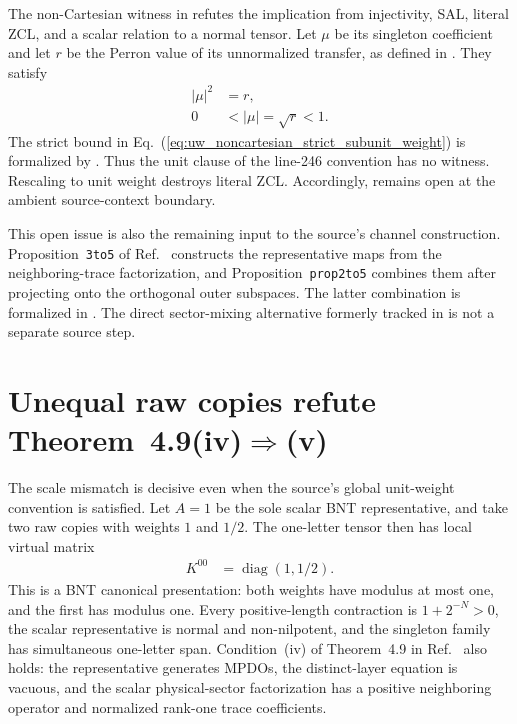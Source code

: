 \documentclass{article}
\begin{document}
The non-Cartesian witness in
 refutes the
implication from injectivity, SAL, literal ZCL, and a scalar relation to a
normal tensor. Let $\mu$ be its singleton coefficient and let $r$ be the
Perron value of its unnormalized transfer, as defined in
. They satisfy
\begin{align}
    |\mu|^2
    &=r,
    \label{eq:uw_noncartesian_weight_perron_relation}\\
    0
    &<|\mu|
    =\sqrt r
    <1.
    \label{eq:uw_noncartesian_strict_subunit_weight}
\end{align}
The strict bound in Eq.~(\ref{eq:uw_noncartesian_strict_subunit_weight}) is
formalized by
. Thus the unit clause of the line-246
convention has no witness. Rescaling to unit weight destroys literal ZCL.
Accordingly,  remains open at the ambient source-context
boundary.

This open issue is also the remaining input to the source's channel
construction. Proposition~\texttt{3to5} of
Ref.~\cite{Cirac2016MPDO_arXiv} constructs the representative maps from the
neighboring-trace factorization, and Proposition~\texttt{prop2to5} combines
them after projecting onto the orthogonal outer subspaces. The latter
combination is formalized in . The direct sector-mixing
alternative formerly tracked in  is not a separate source step.

\section{Unequal raw copies refute Theorem~4.9(iv)$\Rightarrow$(v)}

The scale mismatch is decisive even when the source's global unit-weight
convention is satisfied. Let $A=1$ be the sole scalar BNT representative, and
take two raw copies with weights $1$ and $1/2$. The one-letter tensor then has
local virtual matrix
\begin{align}
    K^{00}
    &=\operatorname{diag}(1,1/2).
    \label{eq:uw_repeated_copy_local_matrix}
\end{align}
This is a BNT canonical presentation: both weights have modulus at most one,
and the first has modulus one. Every positive-length contraction is
$1+2^{-N}>0$, the scalar representative is normal and non-nilpotent, and the
singleton family has simultaneous one-letter span. Condition~(iv) of
Theorem~4.9 in Ref.~\cite{Cirac2016MPDO_arXiv} also holds: the representative
generates MPDOs, the distinct-layer equation is vacuous, and the scalar
physical-sector factorization has a positive neighboring operator and
normalized rank-one trace coefficients.
\end{document}
